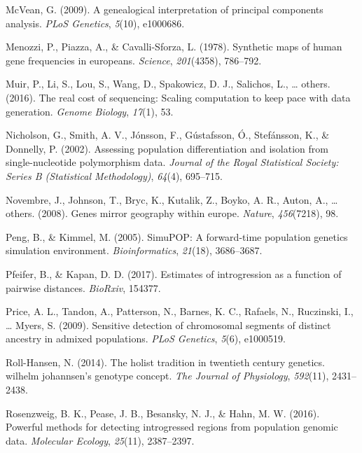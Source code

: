 \documentclass[12pt,a4paper,twoside]{ugathesis}
\theoremstyle{definition}
\theoremstyle{definition}
\theoremstyle{remark}
\begin{document}
\hypertarget{ref-mcvean2009genealogical}{}
McVean, G. (2009). A genealogical interpretation of principal components
analysis. \emph{PLoS Genetics}, \emph{5}(10), e1000686.

\hypertarget{ref-menozzi1978synthetic}{}
Menozzi, P., Piazza, A., \& Cavalli-Sforza, L. (1978). Synthetic maps of
human gene frequencies in europeans. \emph{Science}, \emph{201}(4358),
786--792.

\hypertarget{ref-muir2016real}{}
Muir, P., Li, S., Lou, S., Wang, D., Spakowicz, D. J., Salichos, L.,
\ldots{} others. (2016). The real cost of sequencing: Scaling
computation to keep pace with data generation. \emph{Genome Biology},
\emph{17}(1), 53.

\hypertarget{ref-nicholson2002assessing}{}
Nicholson, G., Smith, A. V., Jónsson, F., Gústafsson, Ó., Stefánsson,
K., \& Donnelly, P. (2002). Assessing population differentiation and
isolation from single-nucleotide polymorphism data. \emph{Journal of the
Royal Statistical Society: Series B (Statistical Methodology)},
\emph{64}(4), 695--715.

\hypertarget{ref-novembre2008genes}{}
Novembre, J., Johnson, T., Bryc, K., Kutalik, Z., Boyko, A. R., Auton,
A., \ldots{} others. (2008). Genes mirror geography within europe.
\emph{Nature}, \emph{456}(7218), 98.

\hypertarget{ref-peng2005simupop}{}
Peng, B., \& Kimmel, M. (2005). SimuPOP: A forward-time population
genetics simulation environment. \emph{Bioinformatics}, \emph{21}(18),
3686--3687.

\hypertarget{ref-pfeifer2017estimates}{}
Pfeifer, B., \& Kapan, D. D. (2017). Estimates of introgression as a
function of pairwise distances. \emph{BioRxiv}, 154377.

\hypertarget{ref-price2009sensitive}{}
Price, A. L., Tandon, A., Patterson, N., Barnes, K. C., Rafaels, N.,
Ruczinski, I., \ldots{} Myers, S. (2009). Sensitive detection of
chromosomal segments of distinct ancestry in admixed populations.
\emph{PLoS Genetics}, \emph{5}(6), e1000519.

\hypertarget{ref-roll2014holist}{}
Roll-Hansen, N. (2014). The holist tradition in twentieth century
genetics. wilhelm johannsen's genotype concept. \emph{The Journal of
Physiology}, \emph{592}(11), 2431--2438.

\hypertarget{ref-rosenzweig2016powerful}{}
Rosenzweig, B. K., Pease, J. B., Besansky, N. J., \& Hahn, M. W. (2016).
Powerful methods for detecting introgressed regions from population
genomic data. \emph{Molecular Ecology}, \emph{25}(11), 2387--2397.
\end{document}
